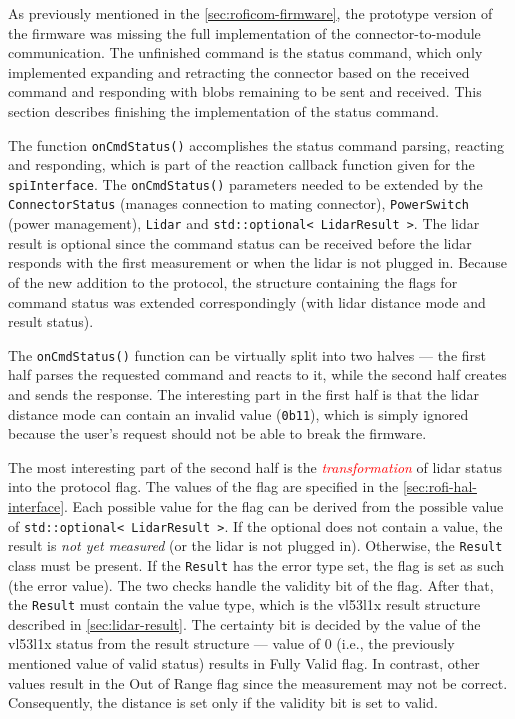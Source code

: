 \documentclass[
  digital,     %
  oneside,     %
  nosansbold,  %
  nocolorbold, %
  nolof,         %
  nolot,         %
]{fithesis4}
\newcommand{\TODO}[1]{\textcolor{red}{\textit{#1}}}
\begin{document}
{{{As previously mentioned in the \autoref{sec:roficom-firmware}, the prototype version of the firmware was missing the full implementation of the connector-to-module communication. The unfinished command is the status command, which only implemented expanding and retracting the connector based on the received command and responding with blobs remaining to be sent and received. This section describes finishing the implementation of the status command.

The function \lstinline|onCmdStatus()| accomplishes the status command parsing, reacting and responding, which is part of the reaction callback function given for the \lstinline|spiInterface|. The \lstinline|onCmdStatus()| parameters needed to be extended by the \lstinline|ConnectorStatus| (manages connection to mating connector), \lstinline|PowerSwitch| (power management), \lstinline|Lidar| and \lstinline|std::optional< LidarResult >|. The \acrshort{lidar} result is optional since the command status can be received before the \acrshort{lidar} responds with the first measurement or when the \acrshort{lidar} is not plugged in. Because of the new addition to the protocol, the structure containing the flags for command status was extended correspondingly (with \acrshort{lidar} distance mode and result status).

The \lstinline|onCmdStatus()| function can be virtually split into two halves --- the first half parses the requested command and reacts to it, while the second half creates and sends the response. The interesting part in the first half is that the \acrshort{lidar} distance mode can contain an invalid value (\lstinline|0b11|), which is simply ignored because the user's request should not be able to break the firmware.

The most interesting part of the second half is the \TODO{transformation} of \acrshort{lidar} status into the protocol flag. The values of the flag are specified in the \autoref{sec:rofi-hal-interface}. Each possible value for the flag can be derived from the possible value of \lstinline|std::optional< LidarResult >|. If the optional does not contain a value,  the result is \emph{not yet measured} (or the \acrshort{lidar} is not plugged in). Otherwise, the \lstinline|Result| class must be present. If the \lstinline|Result| has the error type set, the flag is set as such (the error value). The two checks handle the validity bit of the flag. After that, the \lstinline|Result| must contain the value type, which is the \gls{vl53l1x} result structure described in \autoref{sec:lidar-result}. The certainty bit is decided by the value of the \gls{vl53l1x} status from the result structure --- value of $0$ (i.e., the previously mentioned value of valid status) results in Fully Valid flag. In contrast, other values result in the Out of Range flag since the measurement may not be correct. Consequently, the distance is set only if the validity bit is set to valid.


}}}
\end{document}
